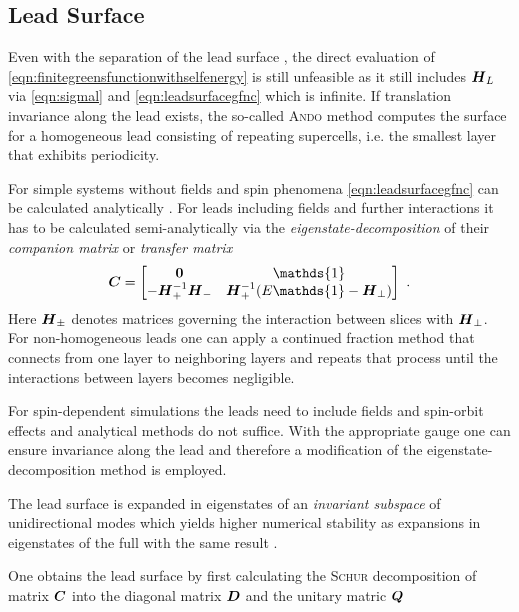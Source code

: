 \subsection{Lead Surface \cgfncs{}}
Even with the separation of the lead surface \gfnc{}, the direct evaluation of \cref{eqn:finitegreensfunctionwithselfenergy} is still unfeasible as it still includes $\boldsymbol{H}_L$ via \cref{eqn:sigmal} and \cref{eqn:leadsurfacegfnc} which is infinite.
If translation invariance along the lead exists, the so-called \textsc{Ando} method \cite{PhysRevB.44.8017} computes the surface \gfnc{} for a homogeneous lead consisting of repeating supercells, i.e. the smallest layer that exhibits periodicity.\par
For simple systems without fields and spin phenomena \cref{eqn:leadsurfacegfnc} can be calculated analytically \cite{Datta1997}. For leads including fields and further interactions it has to be calculated semi-analytically via the \emph{eigenstate-decomposition} of their \emph{companion matrix} \cite{PhysRevB.25.3975} or \emph{transfer matrix} \cite{PhysRevB.55.5266} \cite{PhysRevB.66.205319}
\begin{align}
  \mat{C} =
  \begin{bmatrix}
  \mat{0}  &\mathds{1} \\
  -\mat{H}_{+}^{-1}\mat{H}_{-} &\mat{H}_{+}^{-1} (E\mathds{1} - \mat{H}_{\perp})
  \end{bmatrix}\ .
  \label{eqn:companionmatrix}
\end{align}
Here $\boldsymbol{H}_{\pm}$ denotes matrices governing the interaction between slices with \hamil{} $\boldsymbol{H}_{\perp}$.
For non-homogeneous leads one can apply a continued fraction method \cite{Velev2004} that connects \gfncs{} from one layer to neighboring layers and repeats that process until the interactions between layers becomes negligible.\par
For spin-dependent simulations the leads need to include fields and spin-orbit effects and analytical methods do not suffice. With the appropriate gauge one can ensure invariance along the lead and therefore a modification of the eigenstate-decomposition method is employed.\par
The lead surface \gfnc{} is expanded in eigenstates of an \emph{invariant subspace} of unidirectional modes which yields higher numerical stability as expansions in eigenstates of the full \hamil{} with the same result \cite{Wimmer2009JComPhys}.\par
One obtains the lead surface \gfnc{} by first calculating the \textsc{Schur} decomposition of matrix $\boldsymbol{C}$ into the diagonal matrix $\boldsymbol{D}$ and the unitary matric $\boldsymbol{Q}$
